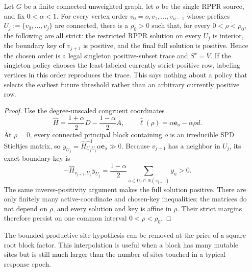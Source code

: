 \begin{lemma}
\label{lem:aesp-cd-connected-order-small-rho}
Let $G$ be a finite connected unweighted graph, let $o$ be the single RPPR
source, and fix $0<\alpha<1$.  For every vertex order
$v_0=o,v_1,\ldots,v_{n-1}$ whose prefixes
$U_j:=\{v_0,\ldots,v_j\}$ are connected, there is a $\rho_0>0$ such that,
for every $0<\rho<\rho_0$, the following are all strict:
the restricted RPPR solution on every $U_j$ is interior, the boundary key of
$v_{j+1}$ is positive, and the final full solution is positive.  Hence the
chosen order is a legal singleton positive-subset trace and $S^\star=V$.
If the singleton policy chooses the least-labeled currently strict-positive
row, labeling vertices in this order reproduces the trace.  This says nothing
about a policy that selects the earliest future threshold rather than an
arbitrary currently positive row.
\end{lemma}

\begin{proof}
Use the degree-unscaled congruent coordinates
\begin{equation*}
 \widehat H=\frac{1+\alpha}{2}D-\frac{1-\alpha}{2}A,
 \qquad
 \widehat\ell(\rho)=\alpha\mathbf e_o-\alpha\rho d.
\end{equation*}
At $\rho=0$, every connected principal block containing $o$ is an
irreducible SPD Stieltjes matrix, so
$y_{U_j}=\widehat H_{U_jU_j}^{-1}\alpha\mathbf e_o\gg0$.
Because $v_{j+1}$ has a neighbor in $U_j$, its exact boundary key is
\begin{equation*}
 -\widehat H_{v_{j+1},U_j}y_{U_j}
 =\frac{1-\alpha}{2}
   \sum_{u\in U_j\cap N(v_{j+1})}y_u>0.
\end{equation*}
The same inverse-positivity argument makes the full solution positive.
There are only finitely many active-coordinate and chosen-key inequalities;
the matrices do not depend on $\rho$, and every solution and key is affine in
$\rho$.  Their strict margins therefore persist on one common interval
$0<\rho<\rho_0$.
\end{proof}

The bounded-productive-site hypothesis can be removed at the price of a
square-root block factor.  This interpolation is useful when a block has many
mutable sites but is still much larger than the number of sites touched in a
typical response epoch.

